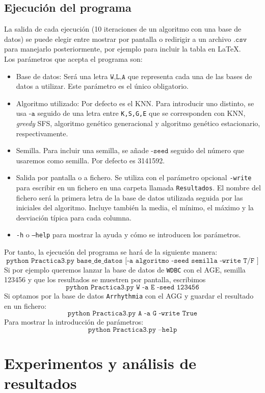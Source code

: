 \documentclass[11pt,leqno]{article}
\begin{document}
\subsection{Ejecución del programa}
La salida de cada ejecución (10 iteraciones de un algoritmo con una base de datos) se puede elegir entre mostrar por pantalla o redirigir a un archivo $\texttt{.csv}$ para manejarlo posteriormente, por ejemplo para incluir la tabla en \LaTeX.\\
Los parámetros que acepta el programa son:
\begin{itemize}
\item Base de datos: Será una letra $\texttt{W,L,A}$ que representa cada una de las bases de datos a utilizar. Este parámetro es el único obligatorio.
\item Algoritmo utilizado: Por defecto es el KNN. Para introducir uno distinto, se usa $\texttt{-a}$ seguido de una letra entre \texttt{K,S,G,E} que se corresponden con KNN, \textit{greedy} SFS, algoritmo genético generacional y algoritmo genético estacionario, respectivamente.
\item Semilla. Para incluir una semilla, se añade $\texttt{-seed}$ seguido del número que usaremos como semilla. Por defecto es 3141592.
\item Salida por pantalla o a fichero. Se utiliza con el parámetro opcional \texttt{-write} para escribir en un fichero en una carpeta llamada \texttt{Resultados}. El nombre del fichero será la primera letra de la base de datos utilizada seguida por las iniciales del algoritmo. Incluye también la media, el mínimo, el máximo y la desviación típica para cada columna.
\item \texttt{-h} o \texttt{--help} para mostrar la ayuda y cómo se introducen los parámetros.
\end{itemize}

Por tanto, la ejecución del programa se hará de la siguiente manera:
\[ \texttt{python Practica3.py base\_de\_datos [-a algoritmo -seed semilla -write T/F ]} \]
Si por ejemplo queremos lanzar la base de datos de \texttt{WDBC} con el AGE, semilla 123456 y que los resultados se muestren por pantalla, escribimos
\[ \texttt{python Practica3.py W -a E -seed 123456}\]
Si optamos por la base de datos \texttt{Arrhythmia} con el AGG y guardar el resultado en un fichero:
\[ \texttt{python Practica3.py A -a G -write True}\]
Para mostrar la introducción de parámetros:
\[ \texttt{python Practica3.py --help}\]

\section{Experimentos y análisis de resultados}
\end{document}
